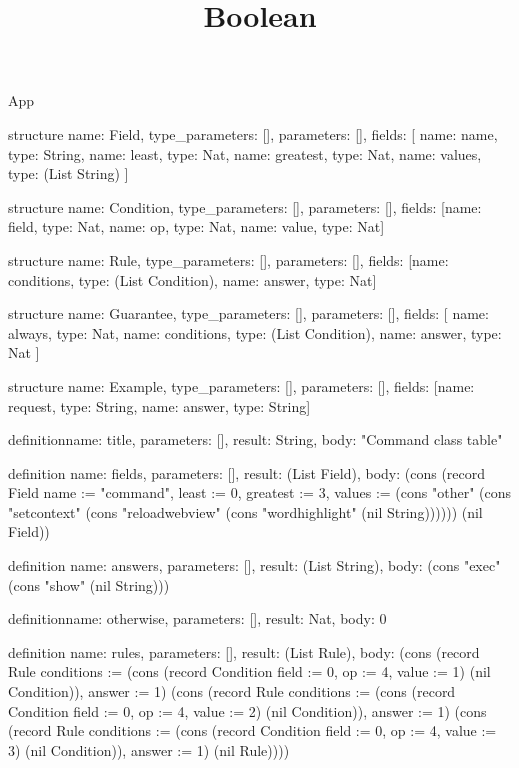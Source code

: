 \begin{lexlean}{App}
\title{Boolean}
\begin{semanticmodule}
structure{
  name: Field,
  type_parameters: [],
  parameters: [],
  fields: [
    {name: name, type: String},
    {name: least, type: Nat},
    {name: greatest, type: Nat},
    {name: values, type: (List String)}
  ]
}

structure{
  name: Condition,
  type_parameters: [],
  parameters: [],
  fields: [{name: field, type: Nat}, {name: op, type: Nat}, {name: value, type: Nat}]
}

structure{
  name: Rule,
  type_parameters: [],
  parameters: [],
  fields: [{name: conditions, type: (List Condition)}, {name: answer, type: Nat}]
}

structure{
  name: Guarantee,
  type_parameters: [],
  parameters: [],
  fields: [
    {name: always, type: Nat},
    {name: conditions, type: (List Condition)},
    {name: answer, type: Nat}
  ]
}

structure{
  name: Example,
  type_parameters: [],
  parameters: [],
  fields: [{name: request, type: String}, {name: answer, type: String}]
}

definition{name: title, parameters: [], result: String, body: "Command class table"}

definition{
  name: fields,
  parameters: [],
  result: (List Field),
  body: (cons (record Field {name := "command", least := 0, greatest := 3, values := (cons "other" (cons "setcontext" (cons "reloadwebview" (cons "wordhighlight" (nil String)))))}) (nil Field))
}

definition{
  name: answers,
  parameters: [],
  result: (List String),
  body: (cons "exec" (cons "show" (nil String)))
}

definition{name: otherwise, parameters: [], result: Nat, body: 0}

definition{
  name: rules,
  parameters: [],
  result: (List Rule),
  body: (cons (record Rule {conditions := (cons (record Condition {field := 0, op := 4, value := 1}) (nil Condition)), answer := 1}) (cons (record Rule {conditions := (cons (record Condition {field := 0, op := 4, value := 2}) (nil Condition)), answer := 1}) (cons (record Rule {conditions := (cons (record Condition {field := 0, op := 4, value := 3}) (nil Condition)), answer := 1}) (nil Rule))))
}


\end{semanticmodule}
\end{lexlean}
